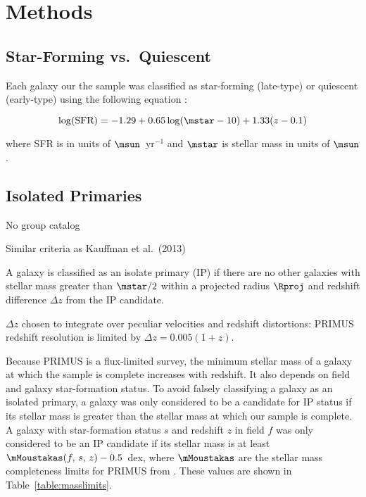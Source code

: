 
\section{Methods}\label{sec:methods}

\subsection{Star-Forming vs.~Quiescent}\label{sec:SFvsQ}

Each galaxy our the sample was classified as star-forming (late-type) or quiescent (early-type) using the following equation :

\begin{equation}\label{eq:}
	\log(\text{SFR}) = -1.29 + 0.65 \log(\mstar-10) + 1.33(z-0.1) %
\end{equation}

where SFR is in units of $\msun$~yr$^{-1}$ and $\mstar$ is stellar mass in units of $\msun$.

\subsection{Isolated Primaries}\label{sec:IP}

No group catalog

Similar criteria as Kauffman et al.~(2013)

A galaxy is classified as an isolate primary (IP) if there are no other galaxies with stellar mass greater than $\mstar/2$ within a projected radius $\Rproj$ and redshift difference $\Delta z$ from the IP candidate.

$\Delta z$ chosen to integrate over peculiar velocities and redshift distortions: PRIMUS redshift resolution is limited by $\Delta z=0.005(1+z)$.

Because PRIMUS is a flux-limited survey, the minimum stellar mass of a galaxy at which the sample is complete increases with redshift.  It also depends on field and galaxy star-formation status.  To avoid falsely classifying a galaxy as an isolated primary, a galaxy was only considered to be a candidate for IP status if its stellar mass is greater than the stellar mass at which our sample is complete.  A galaxy with star-formation status $s$ and redshift $z$ in field $f$ was only considered to be an IP candidate if its stellar mass is at least $\mMoustakas(f,\,s,\,z)-0.5$~dex, where $\mMoustakas$ are the stellar mass completeness limits for PRIMUS from \citet{Moustakas13}.  These values are shown in Table~\ref{table:masslimits}.

